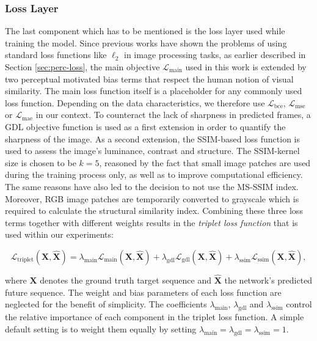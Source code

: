 \subsubsection{Loss Layer}

The last component which has to be mentioned is the loss layer used while training the model. Since previous works have shown the problems of using standard loss functions like $\ell_2$ in image processing tasks, as earlier described in Section \ref{sec:perc-loss}, the main objective $\mathcal{L}_{\textrm{main}}$ used in this work is extended by two perceptual motivated bias terms that respect the human notion of visual similarity. The main loss function itself is a placeholder for any commonly used loss function. Depending on the data characteristics, we therefore use $\mathcal{L}_{\textrm{bce}}$, $\mathcal{L}_{\textrm{mse}}$ or $\mathcal{L}_{\textrm{mae}}$ in our context. To counteract the lack of sharpness in predicted frames, a GDL objective function is used as a first extension in order to quantify the sharpness of the image. As a second extension, the SSIM-based loss function is used to assess the image's luminance, contrast and structure. The SSIM-kernel size is chosen to be $k=5$, reasoned by the fact that small image patches are used during the training process only, as well as to improve computational efficiency. The same reasons have also led to the decision to not use the MS-SSIM index. Moreover, RGB image patches are temporarily converted to grayscale which is required to calculate the structural similarity index. Combining these three loss terms together with different weights results in the \textit{triplet loss function} that is used within our experiments:

\begin{equation} \label{eq:triplet}
\mathcal{L}_{\textrm{triplet}}(\textbf{X}, \hat{\textbf{X}}) = \lambda_{\textrm{main}} \mathcal{L}_{\textrm{main}}(\textbf{X}, \hat{\textbf{X}}) + \lambda_{\textrm{gdl}} \mathcal{L}_{\textrm{gdl}}(\textbf{X}, \hat{\textbf{X}}) + \lambda_{\textrm{ssim}} \mathcal{L}_{\textrm{ssim}}(\textbf{X}, \hat{\textbf{X}}) ,
\end{equation}

where $ \textbf{X} $ denotes the ground truth target sequence and $ \hat{\textbf{X}} $ the network's predicted future sequence. The weight and bias parameters of each loss function are neglected for the benefit of simplicity. The coefficients $\lambda_{\textrm{main}}$, $\lambda_{\textrm{gdl}}$ and $\lambda_{\textrm{ssim}}$ control the relative importance of each component in the triplet loss function. A simple default setting is to weight them equally by setting $\lambda_{\textrm{main}} = \lambda_{\textrm{gdl}} = \lambda_{\textrm{ssim}} = 1$.


